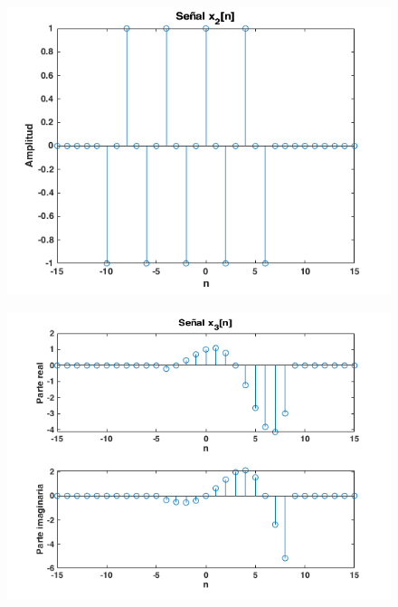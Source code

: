 \documentclass{article}
\begin{document}
\begin{figure}[h!] \caption[Figura 2]{}
	\centering
		\includegraphics[width=\linewidth]{./Figures/02.png}
\end{figure}

\begin{figure} \caption[Figura 3]{}
	\centering
		\includegraphics[width=\linewidth]{./Figures/03.png}
\end{figure}
\end{document}
